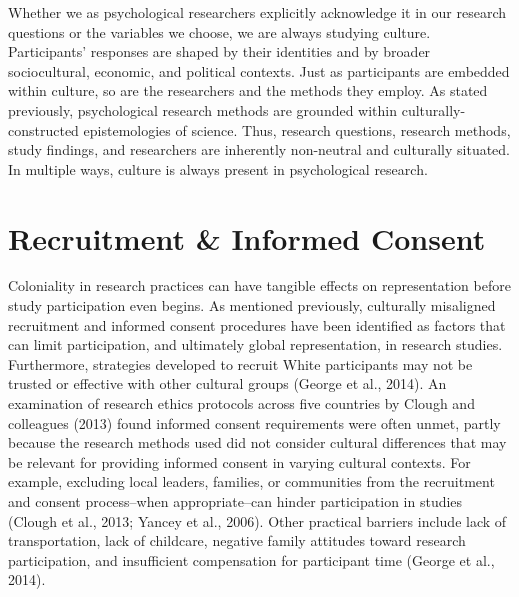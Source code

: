 \documentclass[
  11pt,
]{book}
\begin{document}
Whether we as psychological researchers explicitly acknowledge it in our research questions or the variables we choose, we are always studying culture. Participants' responses are shaped by their identities and by broader sociocultural, economic, and political contexts. Just as participants are embedded within culture, so are the researchers and the methods they employ. As stated previously, psychological research methods are grounded within culturally-constructed epistemologies of science. Thus, research questions, research methods, study findings, and researchers are inherently non-neutral and culturally situated. In multiple ways, culture is always present in psychological research.

\section{Recruitment \& Informed Consent}\label{recruitment-informed-consent}

Coloniality in research practices can have tangible effects on representation before study participation even begins. As mentioned previously, culturally misaligned recruitment and informed consent procedures have been identified as factors that can limit participation, and ultimately global representation, in research studies. Furthermore, strategies developed to recruit White participants may not be trusted or effective with other cultural groups (George et al., 2014). An examination of research ethics protocols across five countries by Clough and colleagues (2013) found informed consent requirements were often unmet, partly because the research methods used did not consider cultural differences that may be relevant for providing informed consent in varying cultural contexts. For example, excluding local leaders, families, or communities from the recruitment and consent process--when appropriate--can hinder participation in studies (Clough et al., 2013; Yancey et al., 2006). Other practical barriers include lack of transportation, lack of childcare, negative family attitudes toward research participation, and insufficient compensation for participant time (George et al., 2014).
\end{document}
